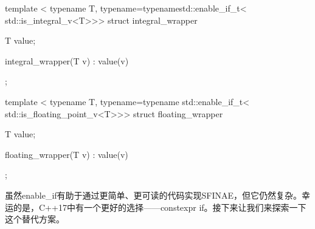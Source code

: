 \begin{cppcode}
template <
	typename T,
	typename=typenamestd::enable_if_t<
						 std::is_integral_v<T>>>
struct integral_wrapper
{
	T value;
	
	integral_wrapper(T v) : value(v) {}
};

template <
	typename T,
	typename=typename std::enable_if_t<
						 std::is_floating_point_v<T>>>
struct floating_wrapper
{
	T value;
	
	floating_wrapper(T v) : value(v) {}
};
\end{cppcode}

虽然enable_if有助于通过更简单、更可读的代码实现SFINAE，但它仍然复杂。幸运的是，C++17中有一个更好的选择——constexpr if。接下来让我们来探索一下这个替代方案。


































